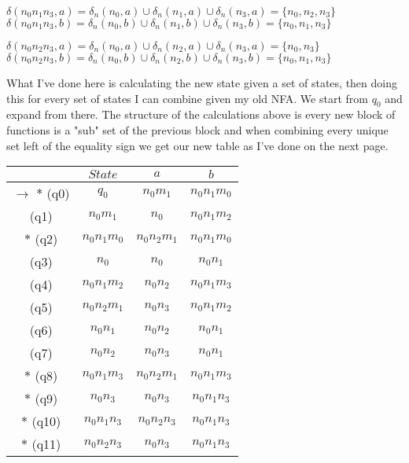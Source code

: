 \documentclass{article}
\begin{document}
$\delta (n_0n_1n_3, a) = \delta_n (n_0,a) \cup \delta_n (n_1,a) \cup \delta_n (n_3,a) = 
\{n_0, n_2, n_3\}$ \newline
$\delta (n_0n_1n_3, b) = \delta_n (n_0,b) \cup \delta_n (n_1,b) \cup \delta_n (n_3,b) = 
\{n_0, n_1, n_3\}$ 

$\delta (n_0n_2n_3, a) = \delta_n (n_0,a) \cup \delta_n (n_2,a) \cup \delta_n (n_3,a) = 
\{n_0, n_3\}$ \newline
$\delta (n_0n_2n_3, b) = \delta_n (n_0,b) \cup \delta_n (n_2,b) \cup \delta_n (n_3,b) = 
\{n_0, n_1, n_3\}$

What I've done here is calculating the new state given a set of states, then doing this 
for every set of states I can combine given my old NFA. We start from $q_0$ and expand 
from there. The structure of the calculations above is every new block of functions is a 
"sub" set of the previous block and when combining every unique set left of the equality 
sign we get our new table as I've done on the next page.

\begin{table}[ht!]
  \huge
  \centering
 \begin{tabular}{||c c c c||} 
 \hline
 & $State$ & $a$ & $b$ \\ [0.5ex] 
 \hline\hline
   $\rightarrow$ $*$   (q0) & $q_0$ & $n_0m_1$ & $n_0n_1m_0$ \\ 
    \hfill             (q1) & $n_0m_1$ & $n_0$ & $n_0n_1m_2$ \\
    \hfill $*$         (q2) & $n_0n_1m_0$ & $n_0n_2m_1$ & $n_0n_1m_0$ \\
    \hfill             (q3) & $n_0$ & $n_0$ & $n_0n_1$\\
    \hfill             (q4) & $n_0n_1m_2$ & $n_0n_2$ & $n_0n_1m_3$ \\
    \hfill             (q5) & $n_0n_2m_1$ & $n_0n_3$ & $n_0n_1m_2$ \\
    \hfill             (q6) & $n_0n_1$ & $n_0n_2$ & $n_0n_1$ \\
    \hfill             (q7) & $n_0n_2$ & $n_0n_3$ & $n_0n_1$ \\
    \hfill $*$         (q8) & $n_0n_1m_3$ & $n_0n_2m_1$ & $n_0n_1m_3$ \\
    \hfill $*$         (q9) & $n_0n_3$ & $n_0n_3$ & $n_0n_1n_3$ \\
    \hfill $*$         (q10)& $n_0n_1n_3$ & $n_0n_2n_3$ & $n_0n_1n_3$ \\
    \hfill $*$         (q11) & $n_0n_2n_3$ & $n_0n_3$ & $n_0n_1n_3$ \\ [1ex]
 \hline
 \end{tabular}
\end{table}
\end{document}
